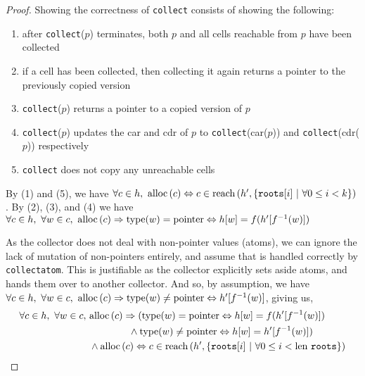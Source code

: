 \begin{proof}
  Showing the correctness of \texttt{collect} consists of showing the
  following:

  \begin{enumerate}
  \item after \texttt{collect}($p$) terminates, both $p$ and all cells
    reachable from $p$ have been collected

  \item if a cell has been collected, then collecting it again returns
    a pointer to the previously copied version

  \item \texttt{collect}($p$) returns a pointer to a copied version of
    $p$

  \item \texttt{collect}($p$) updates the car and cdr of $p$ to
    \texttt{collect}(car($p$)) and \texttt{collect}(cdr($p$))
    respectively

  \item \texttt{collect} does not copy any unreachable cells
  \end{enumerate}

  By (1) and (5), we have $\forall c \in h,\ \alloc{c} \iff c \in
  \reach{h'}{\{\mathtt{roots}[i]~|~\forall 0 \leq i < k\}}$. By (2),
  (3), and (4) we have $\forall c \in h,\ \forall w \in c,\ \mathrm{alloc}\left(c\right)
  \Rightarrow \mathrm{type}(w) = \mathrm{pointer} \Leftrightarrow h[w] =
  f(h'[f^{-1}(w)])$

  As the collector does not deal with non-pointer values (atoms), we
  can ignore the lack of mutation of non-pointers entirely, and assume
  that is handled correctly by \texttt{collectatom}. This is
  justifiable as the collector explicitly sets aside atoms, and hands
  them over to another collector. And so, by assumption, we have
  $\forall c \in h,\ \forall w \in c,\ \mathrm{alloc}\left(c\right) \Rightarrow
  \mathrm{type}(w) \neq \mathrm{pointer} \Leftrightarrow h'[f^{-1}(w)]$, giving
  us,
  \begin{align*}
    \forall c \in h,\ \forall w \in c,\ &\mathrm{alloc}\left(c\right) \Rightarrow
    (\mathrm{type}(w) = \mathrm{pointer} \Leftrightarrow h[w] = f(h'[f^{-1}(w)])\\
    &\quad\quad\quad\quad \land \mathrm{type}(w) \neq \mathrm{pointer}
    \Leftrightarrow h[w] = h'[f^{-1}(w)])\\
    &\land \mathrm{alloc}\left(c\right) \Leftrightarrow c \in \mathrm{reach}\left(h', \{\mathtt{roots}[i]~|~\forall
      0 \leq i < \mathrm{len}~\mathtt{roots}\}\right)
  \end{align*}
\end{proof}

